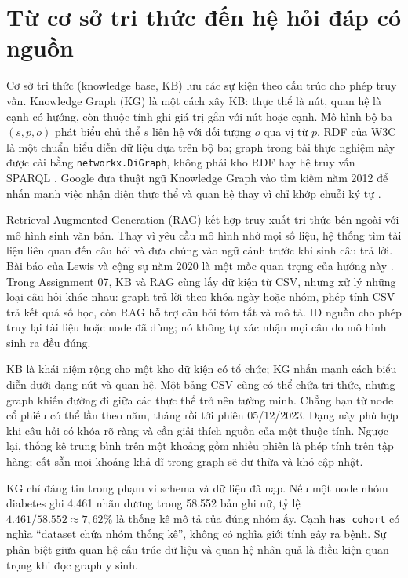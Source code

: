 \documentclass[12pt,a4paper]{report}
\begin{document}
\section{Từ cơ sở tri thức đến hệ hỏi đáp có nguồn}
Cơ sở tri thức (knowledge base, KB) lưu các sự kiện theo cấu trúc cho phép truy vấn. Knowledge Graph
(KG) là một cách xây KB: thực thể là nút, quan hệ là cạnh có hướng, còn thuộc tính ghi giá trị gắn
với nút hoặc cạnh. Mô hình bộ ba $(s,p,o)$ phát biểu chủ thể $s$ liên hệ với đối tượng $o$ qua
vị từ $p$. RDF của W3C là một chuẩn biểu diễn dữ liệu dựa trên bộ ba; graph trong bài thực nghiệm
này được cài bằng \texttt{networkx.DiGraph}, không phải kho RDF hay hệ truy vấn SPARQL
\cite{essay03-w3c}. Google đưa thuật ngữ Knowledge Graph vào tìm kiếm năm 2012 để nhấn mạnh việc
nhận diện thực thể và quan hệ thay vì chỉ khớp chuỗi ký tự \cite{essay03-google}.

Retrieval-Augmented Generation (RAG) kết hợp truy xuất tri thức bên ngoài với mô hình sinh văn bản.
Thay vì yêu cầu mô hình nhớ mọi số liệu, hệ thống tìm tài liệu liên quan đến câu hỏi và đưa chúng
vào ngữ cảnh trước khi sinh câu trả lời. Bài báo của Lewis và cộng sự năm 2020 là một mốc quan
trọng của hướng này \cite{essay03-lewis}. Trong Assignment 07, KB và RAG cùng lấy dữ kiện từ CSV,
nhưng xử lý những loại câu hỏi khác nhau: graph trả lời theo khóa ngày hoặc nhóm, phép tính CSV
trả kết quả số học, còn RAG hỗ trợ câu hỏi tóm tắt và mô tả. ID nguồn cho phép truy lại tài liệu
hoặc node đã dùng; nó không tự xác nhận mọi câu do mô hình sinh ra đều đúng.

KB là khái niệm rộng cho một kho dữ kiện có tổ chức; KG nhấn mạnh cách biểu diễn dưới dạng nút và quan hệ. Một bảng CSV cũng có thể chứa tri thức, nhưng graph khiến đường đi giữa các thực thể trở nên tường minh. Chẳng hạn từ node cổ phiếu có thể lần theo năm, tháng rồi tới phiên 05/12/2023. Dạng này phù hợp khi câu hỏi có khóa rõ ràng và cần giải thích nguồn của một thuộc tính. Ngược lại, thống kê trung bình trên một khoảng gồm nhiều phiên là phép tính trên tập hàng; cất sẵn mọi khoảng khả dĩ trong graph sẽ dư thừa và khó cập nhật.

KG chỉ đáng tin trong phạm vi schema và dữ liệu đã nạp. Nếu một node nhóm diabetes ghi 4.461 nhãn dương trong 58.552 bản ghi nữ, tỷ lệ $4.461/58.552\approx7{,}62\%$ là thống kê mô tả của đúng nhóm ấy. Cạnh \texttt{has\_cohort} có nghĩa ``dataset chứa nhóm thống kê'', không có nghĩa giới tính gây ra bệnh. Sự phân biệt giữa quan hệ cấu trúc dữ liệu và quan hệ nhân quả là điều kiện quan trọng khi đọc graph y sinh.
\end{document}
